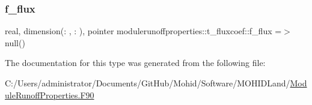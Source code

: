 \mbox{\label{structmodulerunoffproperties_1_1t__fluxcoef_a36cc21c5d7b2b61a4585f686ab0bb2a0}} 
\subsubsection{\texorpdfstring{f\+\_\+flux}{f\_flux}}
{\footnotesize\ttfamily real, dimension(\+: , \+: ), pointer modulerunoffproperties\+::t\+\_\+fluxcoef\+::f\+\_\+flux =$>$ null()\hspace{0.3cm}{\ttfamily [private]}}



The documentation for this type was generated from the following file\+:\begin{DoxyCompactItemize}
\item 
C\+:/\+Users/administrator/\+Documents/\+Git\+Hub/\+Mohid/\+Software/\+M\+O\+H\+I\+D\+Land/\mbox{\hyperlink{_module_runoff_properties_8_f90}{Module\+Runoff\+Properties.\+F90}}\end{DoxyCompactItemize}
